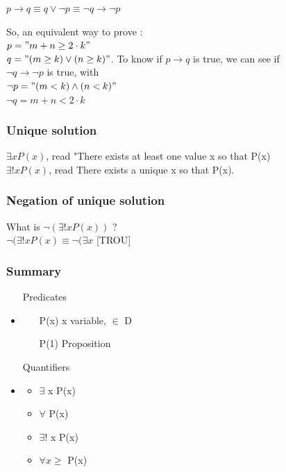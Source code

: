 \documentclass[12pt,a4paper]{article}
\begin{document}
$p \rightarrow q \equiv q \vee \neg p \equiv \neg q \rightarrow \neg p$\\
\begin{center}
\end{center}

So, an equivalent way to prove :\\
$p = "m+n \geq 2\cdot k"$\\
$q = "(m\geq k) \vee (n \geq k)"$. To know if $p \rightarrow q$ is true, we can  see if \\
$\neg q \rightarrow \neg p$ is true, with\\
$\neg p = "(m < k) \wedge (n < k)"$\\
$\neg q = m+n < 2\cdot k$ 

\subsubsection{Unique solution}
$\exists x P(x)$, read "There exists at least one value x so that P(x)\\
$\exists ! x P(x)$, read There exists a unique x so that P(x).

\subsubsection{Negation of unique solution}
What is $\neg (\exists ! x P(x))$ ?\\
$\neg (\exists ! x P(x) \equiv \neg (\exists x$ [TROU]

\subsubsection{Summary}
\begin{itemize}
	\item[Predicates]
	\item 
	\begin{itemize}
		\item[P(x)] x variable, $\in$ D
		\item[P(1)] Proposition
	\end{itemize}
	\item[Quantifiers]
	\item 
	\begin{itemize}
		\item $\exists$ x P(x)
		\item $\forall$ P(x)
		\item $\exists !$ x P(x)
		\item $\forall x \geq$  P(x)
	\end{itemize}
\end{itemize}
\end{document}
